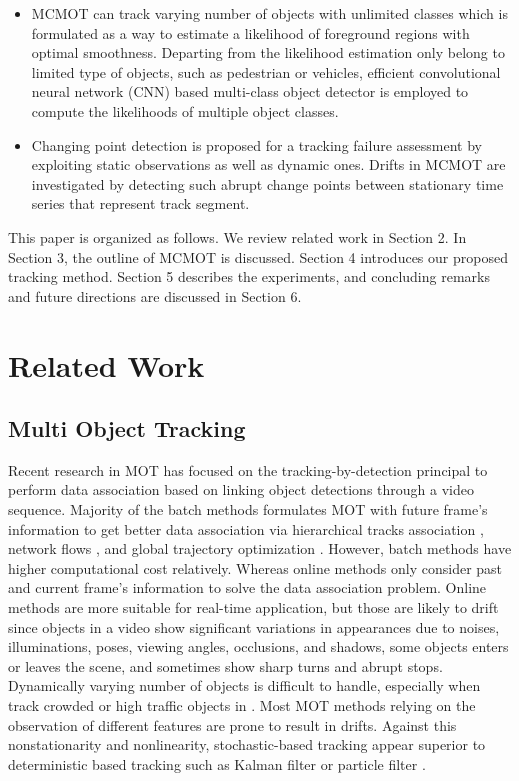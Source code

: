 \documentclass[runningheads]{llncs}
\begin{document}
\begin{itemize}
    \item[] MCMOT can track varying number of objects with unlimited classes which is formulated as a way to estimate a likelihood of foreground regions with optimal smoothness. Departing from the likelihood estimation only belong to limited type of objects, such as pedestrian or vehicles, efficient convolutional neural network (CNN) based multi-class object detector is employed to compute the likelihoods of multiple object classes.
    \item[] Changing point detection is proposed for a tracking failure assessment by exploiting static observations as well as dynamic ones. Drifts in MCMOT are investigated by detecting such abrupt change points between stationary time series that represent track segment.
\end{itemize}

This paper is organized as follows. We review related work in Section 2. In Section 3, the outline of MCMOT is discussed. Section 4 introduces our proposed tracking method. Section 5 describes the experiments, and concluding remarks and future directions are discussed in Section 6.

\section{Related Work}

\subsection{Multi Object Tracking}

Recent research in MOT has focused on the tracking-by-detection principal to perform data association based on linking object detections through a video sequence. Majority of the batch methods formulates MOT with future frame's information to get better data association via hierarchical tracks association \cite{Ref13}, network flows \cite{Ref12}, and global trajectory optimization \cite{Ref11}. However, batch methods have higher computational cost relatively. Whereas online methods only consider past and current frame's information to solve the data association problem. Online methods are more suitable for real-time application, but those are likely to drift since objects in a video show significant variations in appearances due to noises, illuminations, poses, viewing angles, occlusions, and shadows, some objects enters or leaves the scene, and sometimes show sharp turns and abrupt stops. Dynamically varying number of objects is difficult to handle, especially when track crowded or high traffic objects in \cite{Ref9,Ref10,Ref14}. Most MOT methods relying on the observation of different features are prone to result in drifts. Against this nonstationarity and nonlinearity, stochastic-based tracking \cite{Ref22,Ref23,Ref24} appear superior to deterministic based tracking such as Kalman filter \cite{Ref33} or particle filter \cite{Ref2}.
\end{document}
